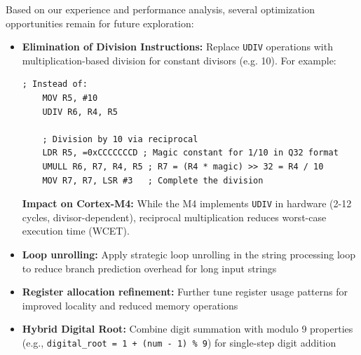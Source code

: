 \documentclass[a4paper,12pt]{article}
\newenvironment{sectionbox}[1]{%
    \tcolorbox[
        colback=titleblue!5,
        colframe=titleblue!50,
        arc=3mm,
        title=#1,
        fonttitle=\bfseries\sffamily,
        before skip=1.2em,
        after skip=1.2em
    ]
}{\endtcolorbox}
\begin{document}
\begin{sectionbox}{Future Work}
Based on our experience and performance analysis, several optimization opportunities remain for future exploration:

\begin{itemize}[leftmargin=2em]
    \item \textbf{Elimination of Division Instructions:}
    Replace \texttt{UDIV} operations with multiplication-based division for constant divisors (e.g. 10). For example:
    \begin{lstlisting}[language={[x86masm]Assembler}]
    ; Instead of:
    MOV R5, #10
    UDIV R6, R4, R5
    
    ; Division by 10 via reciprocal
    LDR R5, =0xCCCCCCCD ; Magic constant for 1/10 in Q32 format
    UMULL R6, R7, R4, R5 ; R7 = (R4 * magic) >> 32 = R4 / 10
    MOV R7, R7, LSR #3   ; Complete the division
    \end{lstlisting}

    \begin{tcolorbox}[colback=titleblue!3,colframe=titleblue!30,arc=2mm]
    \textbf{Impact on Cortex-M4:}  
    While the M4 implements \texttt{UDIV} in hardware (2-12 cycles, divisor-dependent), reciprocal multiplication reduces worst-case execution time (WCET). 
    \end{tcolorbox}
        
    \item \textbf{Loop unrolling:} Apply strategic loop unrolling in the string processing loop to reduce branch prediction overhead for long input strings
    \item \textbf{Register allocation refinement:} Further tune register usage patterns for improved locality and reduced memory operations
    \item \textbf{Hybrid Digital Root:}  
    Combine digit summation with modulo 9 properties (e.g., \texttt{digital\_root = 1 + (num - 1) \% 9}) for single-step digit addition

\end{itemize}
\end{sectionbox}
\end{document}
